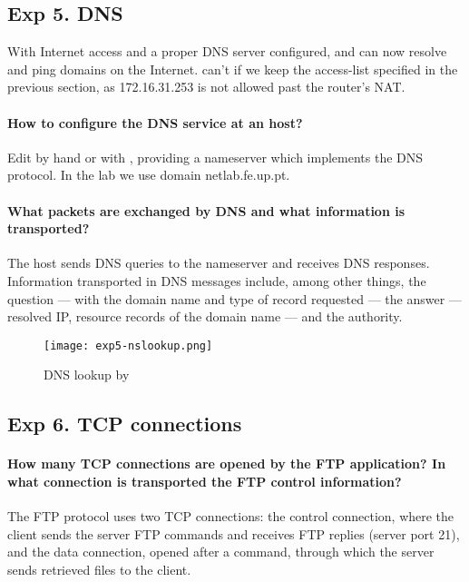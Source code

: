\documentclass[compilation.tex]{subfiles}
\begin{document}
\subsection[DNS]{Exp 5. DNS}
\label{exp:5}

With Internet access and a proper DNS server configured,  and  can now resolve and ping domains on the Internet.  can't if we keep the access-list specified in the previous section, as 172.16.31.253 is not allowed past the router's NAT.

\paragraph{How to configure the DNS service at an host?}
Edit  by hand or with , providing a nameserver which implements the DNS protocol. In the lab we use domain netlab.fe.up.pt.

\paragraph{What packets are exchanged by DNS and what information is transported?}
The host sends DNS queries to the nameserver and receives DNS responses. Information transported in DNS messages include, among other things, the question --- with the domain name and type of record requested --- the answer --- resolved IP, resource records of the domain name --- and the authority.

\begin{figure}[hbtp]
\centering
\texttt{[image: exp5-nslookup.png]}
\caption{DNS lookup by }
\label{fig:exp5-nslookup}
\end{figure}

\subsection[TCP connections]{Exp 6. TCP connections}
\label{exp:6}

\paragraph{How many TCP connections are opened by the FTP application? In what connection is transported the FTP control information?}
The FTP protocol uses two TCP connections: the control connection, where the client sends the server FTP commands and receives FTP replies (server port 21), and the data connection, opened after a  command, through which the server sends retrieved files to the client.
\end{document}
